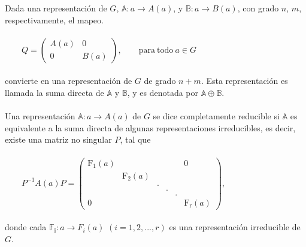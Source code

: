 \documentclass[12pt]{book}
\theoremstyle{definition}
\newcounter{in}
\begin{document}
Dada una representación de $G$, $\mathbb{A}: a \rightarrow A\left(a\right)$, y $\mathbb{B}: a \rightarrow B\left(a\right)$, con grado $n$, $m$, respectivamente, el mapeo.\\~\\
$\qquad 
Q=
\begin{pmatrix}
A\left(a\right) & 0 \\ 
0 & B\left(a\right)
\end{pmatrix}, \qquad \mathrm{para\ todo\ } a \in G$\\~\\
convierte en una representación de $G$ de grado $n+m$. Esta representación es llamada la suma directa de $\mathbb{A}$ y $\mathbb{B}$, y es denotada por $\mathbb{A}\oplus\mathbb{B}$.\\~\\
Una representación $\mathbb{A}: a \rightarrow A\left(a\right)$ de $G$ se dice completamente reducible si $\mathbb{A}$ es equivalente a la suma directa de algunas representaciones irreducibles, es decir, existe una matriz no singular $P$, tal que\\~\\
$\qquad 
P^{-1}A\left(a\right)P=
\begin{pmatrix}
\mathrm{F_{1}}\left(a\right) & & & & & 0\\
 & \mathrm{F_{2}}\left(a\right) & & & & \\
 & & . & & & \\
 & & & . & & \\
 & & & & . & \\
0 & & & & & \mathrm{F_{r}}\left(a\right)
\end{pmatrix}$,\\~\\
donde cada $\mathbb{F_{i}}: a \rightarrow F_{i}\left(a\right)$ $\left(i=1,2,...,r\right)$ es una representación irreducible de $G$.\\~\\
\end{document}
